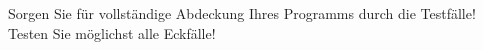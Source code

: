   Sorgen Sie für vollständige Abdeckung Ihres Programms durch die
  Testfälle!  Testen Sie möglichst alle Eckfälle!
